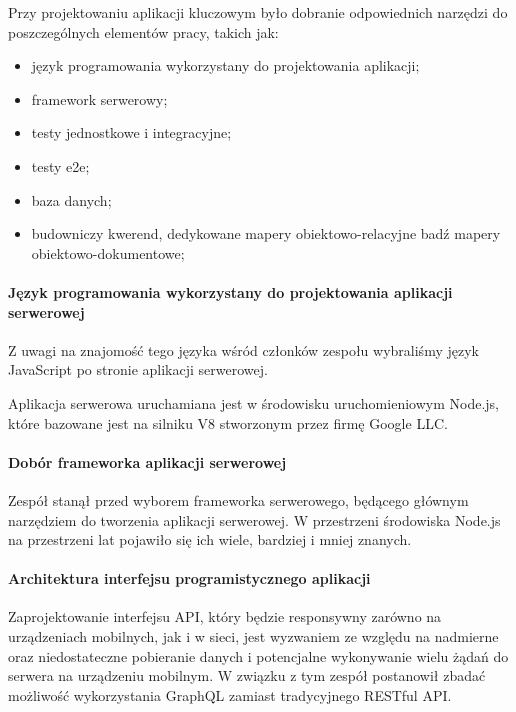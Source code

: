 \documentclass[12pt, a4paper, twoside, openany]{book}
\newcommand{\forceindent}{\leavevmode{\parindent=1.3em\indent}}
\begin{document}
Przy projektowaniu aplikacji kluczowym było dobranie odpowiednich narzędzi do
poszczególnych elementów pracy, takich jak:
\begin{itemize}
    \item język programowania wykorzystany do projektowania aplikacji;
    \item framework serwerowy;
    \item testy jednostkowe i integracyjne;
    \item testy e2e;
    \item baza danych;
    \item budowniczy kwerend, dedykowane mapery obiektowo-relacyjne badź mapery obiektowo-dokumentowe;
\end{itemize}

\paragraph{Język programowania wykorzystany do projektowania aplikacji serwerowej\\}

\forceindent Z uwagi na znajomość tego języka wśród członków zespołu wybraliśmy język JavaScript
po stronie aplikacji serwerowej.

Aplikacja serwerowa uruchamiana jest w środowisku uruchomieniowym Node.js, które bazowane jest na
silniku V8 stworzonym przez firmę Google LLC.

\paragraph{Dobór frameworka aplikacji serwerowej\\}
\forceindent Zespół stanął przed wyborem frameworka serwerowego, będącego głównym narzędziem do tworzenia aplikacji serwerowej.
W przestrzeni środowiska Node.js na przestrzeni lat pojawiło się ich wiele, bardziej i
mniej znanych.

\paragraph{Architektura interfejsu programistycznego aplikacji\\}
\forceindent Zaprojektowanie interfejsu API, który będzie responsywny zarówno na urządzeniach mobilnych, jak i w sieci, jest wyzwaniem ze względu na nadmierne oraz niedostateczne pobieranie danych i potencjalne wykonywanie wielu żądań do serwera na urządzeniu mobilnym.
W związku z tym zespół postanowił zbadać możliwość wykorzystania GraphQL zamiast tradycyjnego RESTful API.
\end{document}
